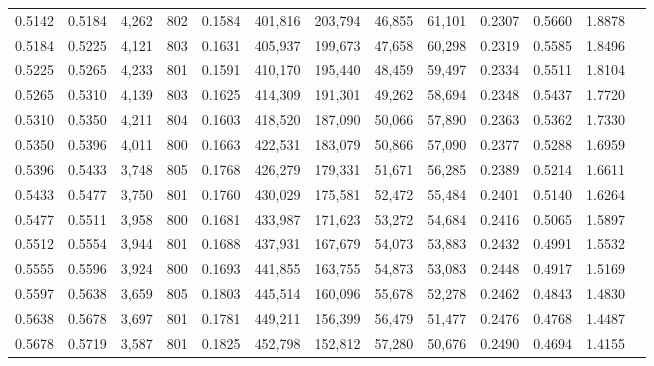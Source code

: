 \begin{tabular}{rrrrrrrrrrrrr}
0.5142 & 0.5184 &  4,262 &   802 &                                     0.1584 & 401,816 & 203,794 &  46,855 &  61,101 & 0.2307 & 0.5660 & 1.8878 \\
0.5184 & 0.5225 &  4,121 &   803 &                                     0.1631 & 405,937 & 199,673 &  47,658 &  60,298 & 0.2319 & 0.5585 & 1.8496 \\
0.5225 & 0.5265 &  4,233 &   801 &                                     0.1591 & 410,170 & 195,440 &  48,459 &  59,497 & 0.2334 & 0.5511 & 1.8104 \\
0.5265 & 0.5310 &  4,139 &   803 &                                     0.1625 & 414,309 & 191,301 &  49,262 &  58,694 & 0.2348 & 0.5437 & 1.7720 \\
0.5310 & 0.5350 &  4,211 &   804 &                                     0.1603 & 418,520 & 187,090 &  50,066 &  57,890 & 0.2363 & 0.5362 & 1.7330 \\
0.5350 & 0.5396 &  4,011 &   800 &                                     0.1663 & 422,531 & 183,079 &  50,866 &  57,090 & 0.2377 & 0.5288 & 1.6959 \\
0.5396 & 0.5433 &  3,748 &   805 &                                     0.1768 & 426,279 & 179,331 &  51,671 &  56,285 & 0.2389 & 0.5214 & 1.6611 \\
0.5433 & 0.5477 &  3,750 &   801 &                                     0.1760 & 430,029 & 175,581 &  52,472 &  55,484 & 0.2401 & 0.5140 & 1.6264 \\
0.5477 & 0.5511 &  3,958 &   800 &                                     0.1681 & 433,987 & 171,623 &  53,272 &  54,684 & 0.2416 & 0.5065 & 1.5897 \\
0.5512 & 0.5554 &  3,944 &   801 &                                     0.1688 & 437,931 & 167,679 &  54,073 &  53,883 & 0.2432 & 0.4991 & 1.5532 \\
0.5555 & 0.5596 &  3,924 &   800 &                                     0.1693 & 441,855 & 163,755 &  54,873 &  53,083 & 0.2448 & 0.4917 & 1.5169 \\
0.5597 & 0.5638 &  3,659 &   805 &                                     0.1803 & 445,514 & 160,096 &  55,678 &  52,278 & 0.2462 & 0.4843 & 1.4830 \\
0.5638 & 0.5678 &  3,697 &   801 &                                     0.1781 & 449,211 & 156,399 &  56,479 &  51,477 & 0.2476 & 0.4768 & 1.4487 \\
0.5678 & 0.5719 &  3,587 &   801 &                                     0.1825 & 452,798 & 152,812 &  57,280 &  50,676 & 0.2490 & 0.4694 & 1.4155 \\

\end{tabular}
